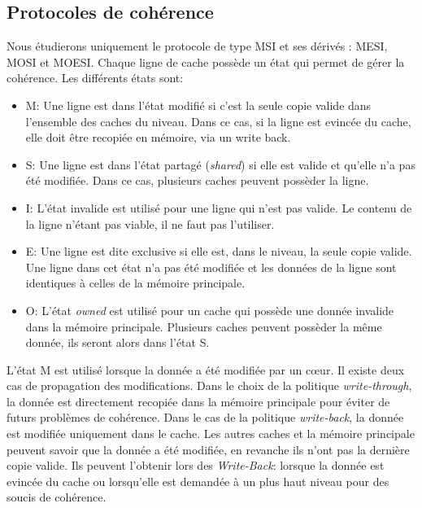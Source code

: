 \subsection{Protocoles de cohérence}
\label{coherence}
 Nous étudierons uniquement le protocole de type MSI et ses dérivés : MESI, MOSI et MOESI. Chaque ligne de cache possède un état qui permet de gérer la cohérence. Les différents états sont: \\
\begin{itemize}
\item M: Une ligne est dans l'état modifié si c'est la seule copie valide dans l'ensemble des caches du niveau. Dans ce cas, si la ligne est evincée du cache, elle doit être recopiée en mémoire, via un write back. \\
\item S: Une ligne est dans l'état partagé (\textit{shared}) si elle est valide et qu'elle n'a pas été modifiée. Dans ce cas, plusieurs caches peuvent possèder la ligne. \\
\item I: L'état invalide est utilisé pour une ligne qui n'est pas valide. Le contenu de la ligne n'étant pas viable, il ne faut pas l'utiliser. \\
\item E: Une ligne est dite exclusive si elle est, dans le niveau, la seule copie valide. Une ligne dans cet état n'a pas été modifiée et les données de la ligne sont identiques à celles de la mémoire principale. \\
\item O: L'état \textit{owned} est utilisé pour un cache qui possède une donnée invalide dans la mémoire principale. Plusieurs caches peuvent possèder la même donnée, ils seront alors dans l'état S. \\
\end{itemize}

L'état M est utilisé lorsque la donnée a été modifiée par un c{\oe}ur. Il existe deux cas de propagation des modifications. Dans le choix de la politique \textit{write-through}, la donnée est directement recopiée dans la mémoire principale pour éviter de futurs problèmes de cohérence. Dans le cas de la politique \textit{write-back}, la donnée est modifiée uniquement dans le cache. Les autres caches et la mémoire principale peuvent savoir que la donnée a été modifiée, en revanche ils n'ont pas la dernière copie valide. Ils peuvent l'obtenir lors des \textit{Write-Back}: lorsque la donnée est evincée du cache ou lorsqu'elle est demandée à un plus haut niveau pour des soucis de cohérence.\\

